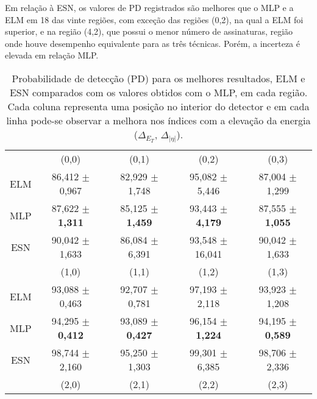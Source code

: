 Em relação à ESN, os valores de PD registrados são melhores que o MLP e a ELM em 18 das vinte regiões, com exceção das regiões (0,2), na qual a ELM foi superior, e na região (4,2), que possui o menor número de assinaturas, região onde houve desempenho equivalente para as três técnicas. Porém, a incerteza é elevada em relação MLP.

\begin{table}[H]
	\centering
	\caption{Probabilidade de detecção (PD) para os melhores resultados, ELM e ESN comparados com os valores obtidos com o MLP, em cada região. Cada coluna representa uma posição no interior do detector e em cada linha pode-se observar a melhora nos índices com a elevação da energia ($\Delta_{E_T}$, $\Delta_{|\eta|}$).}
	\label{tab:pd_2015}
	\begin{footnotesize}
		\setlength{\extrarowheight}{1pt}       %
		\begin{tabular}{c*{4}c} \toprule
			    &        (0,0)       &       (0,1)        &       (0,2)         &      (0,3)         \\ \cmidrule(lr){2-2}\cmidrule(lr){3-3}\cmidrule(lr){4-4}\cmidrule(lr){5-5}
			ELM & 86,412 $\pm$ 0,967 & 82,929 $\pm$ 1,748 & \cellcolor{red!15}95,082 $\pm$  5,446 & 87,004 $\pm$ 1,299 \\
			MLP & 87,622 $\pm$\textbf{ 1,311} & 85,125 $\pm$ \textbf{1,459} & 93,443 $\pm$  \textbf{4,179} & 87,555 $\pm$ \textbf{1,055} \\
			ESN & 90,042 $\pm$ 1,633 & 86,084 $\pm$ 6,391 & 93,548 $\pm$ 16,041 & 90,042 $\pm$ 1,633 \\\midrule \midrule
		    	&        (1,0)       &       (1,1)        &        (1,2)        &       (1,3)        \\ \cmidrule(lr){2-2}\cmidrule(lr){3-3}\cmidrule(lr){4-4}\cmidrule(lr){5-5}             
			ELM & 93,088 $\pm$ 0,463 & 92,707 $\pm$ 0,781 &  97,193 $\pm$ 2,118 & 93,923 $\pm$ 1,208  \\
			MLP & 94,295 $\pm$ \textbf{0,412} & 93,089 $\pm$ \textbf{0,427} &  96,154 $\pm$ \textbf{1,224} & 94,195 $\pm$ \textbf{0,589}  \\
			ESN & 98,744 $\pm$ 2,160 & 95,250 $\pm$ 1,303 &  99,301 $\pm$ 6,385 & 98,706 $\pm$ 2,336  \\\midrule \midrule
			    &          (2,0)     &        (2,1)       &         (2,2)       &       (2,3)        \\ \cmidrule(lr){2-2}\cmidrule(lr){3-3}\cmidrule(lr){4-4}\cmidrule(lr){5-5}                 

\end{tabular}
\end{footnotesize}
\end{table}
